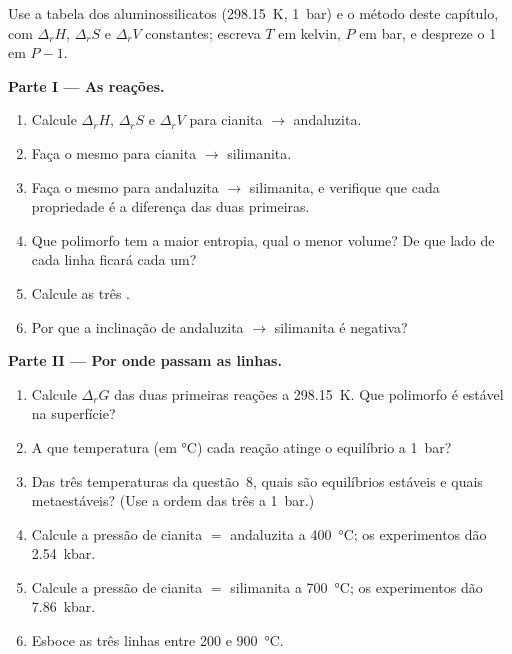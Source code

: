 \begin{problem}
\label{pb:b2:metamorphic-facies:1}
Use a tabela dos aluminossilicatos (\qty{298.15}{K}, \qty{1}{bar}) e o método deste
capítulo, com $\Delta_r H$, $\Delta_r S$ e $\Delta_r V$ constantes; escreva $T$ em
kelvin, $P$ em bar, e despreze o 1 em $P - 1$.

\noindent\textbf{Parte I --- As reações.}
\begin{enumerate}
\item Calcule $\Delta_r H$, $\Delta_r S$ e $\Delta_r V$ para cianita $\to$ andaluzita.
\item Faça o mesmo para cianita $\to$ silimanita.
\item Faça o mesmo para andaluzita $\to$ silimanita, e verifique que cada propriedade é a
diferença das duas primeiras.
\item Que polimorfo tem a maior entropia, qual o menor volume? De que lado
de cada linha ficará cada um?
\item Calcule as três .
\item Por que a inclinação de andaluzita $\to$ silimanita é negativa?
\end{enumerate}

\noindent\textbf{Parte II --- Por onde passam as linhas.}
\begin{enumerate}[resume]
\item Calcule $\Delta_r G$ das duas primeiras reações a \qty{298.15}{K}. Que
polimorfo é estável na superfície?
\item A que temperatura (em \unit{\celsius}) cada reação atinge o equilíbrio a
\qty{1}{bar}?
\item Das três temperaturas da questão~8, quais são equilíbrios estáveis e quais
metaestáveis? (Use a ordem das três a \qty{1}{bar}.)
\item Calcule a pressão de cianita $=$ andaluzita a \qty{400}{\celsius}; os
experimentos dão \qty{2.54}{kbar}.
\item Calcule a pressão de cianita $=$ silimanita a \qty{700}{\celsius}; os
experimentos dão \qty{7.86}{kbar}.
\item Esboce as três linhas entre 200 e \qty{900}{\celsius}.
\end{enumerate}


\end{problem}
